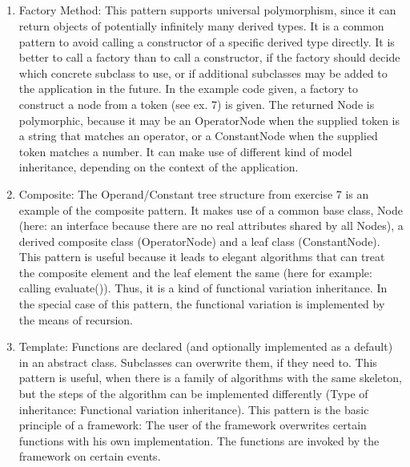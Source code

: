 \subsection{}

\begin{enumerate}
\item Factory Method: This pattern supports universal polymorphism, since it can return objects of potentially infinitely many derived types. It is a common pattern to avoid calling a constructor of a specific derived type directly. It is better to call a factory than to call a constructor, if the factory should decide which concrete subclass to use, or if additional subclasses may be added to the application in the future. In the example code given, a factory to construct a node from a token (see ex. 7) is given. The returned Node is polymorphic, because it may be an OperatorNode when the supplied token is a string that matches an operator, or a ConstantNode when the supplied token matches a number. It can make use of different kind of model inheritance, depending on the context of the application.
\item Composite: The Operand/Constant tree structure from exercise 7 is an example of the composite pattern. It makes use of a common base class, Node (here: an interface because there are no real attributes shared by all Nodes), a derived composite class (OperatorNode) and a leaf class (ConstantNode). This pattern is useful because it leads to elegant algorithms that can treat the composite element and the leaf element the same (here for example: calling evaluate()). Thus, it is a kind of functional variation inheritance. In the special case of this pattern, the functional variation is implemented by the means of recursion.

\item Template: Functions are declared (and optionally implemented as a default) in an abstract class. Subclasses can overwrite them, if they need to. This pattern is useful, when there is a family of algorithms with the same skeleton, but the steps of the algorithm can be implemented differently (Type of inheritance: Functional variation inheritance). This pattern is the basic principle of a framework: The user of the framework overwrites certain functions with his own implementation. The functions are invoked by the framework on certain events.
\end{enumerate}
